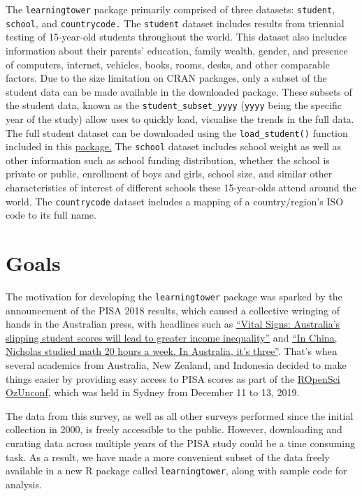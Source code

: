 \documentclass[
  11pt,
  a4paper,
]{article}
\begin{document}
The \texttt{learningtower} package primarily comprised of three
datasets: \texttt{student}, \texttt{school}, and \texttt{countrycode.}
The \texttt{student} dataset includes results from triennial testing of
15-year-old students throughout the world. This dataset also includes
information about their parents' education, family wealth, gender, and
presence of computers, internet, vehicles, books, rooms, desks, and
other comparable factors. Due to the size limitation on CRAN packages,
only a subset of the student data can be made available in the
downloaded package. These subsets of the student data, known as the
\texttt{student\_subset\_yyyy} (\texttt{yyyy} being the specific year of
the study) allow uses to quickly load, visualise the trends in the full
data. The full student dataset can be downloaded using the
\texttt{load\_student()} function included in this
\href{https://kevinwang09.github.io/learningtower/}{package.} The
\texttt{school} dataset includes school weight as well as other
information such as school funding distribution, whether the school is
private or public, enrollment of boys and girls, school size, and
similar other characteristics of interest of different schools these
15-year-olds attend around the world. The \texttt{countrycode} dataset
includes a mapping of a country/region's ISO code to its full name.

\section{Goals}\label{goals}

The motivation for developing the \texttt{learningtower} package was
sparked by the announcement of the PISA 2018 results, which caused a
collective wringing of hands in the Australian press, with headlines
such as
\href{https://theconversation.com/vital-signs-australias-slipping-student-scores-will-lead-to-greater-income-inequality-128301}{``Vital
Signs: Australia's slipping student scores will lead to greater income
inequality''} and
\href{https://www.smh.com.au/education/in-china-nicholas-studied-maths-20-hours-a-week-in-australia-it-s-three-20191203-p53ggv.html}{``In
China, Nicholas studied math 20 hours a week. In Australia, it's
three''}. That's when several academics from Australia, New Zealand, and
Indonesia decided to make things easier by providing easy access to PISA
scores as part of the \href{https://ozunconf19.ropensci.org/}{ROpenSci
OzUnconf}, which was held in Sydney from December 11 to 13, 2019.

The data from this survey, as well as all other surveys performed since
the initial collection in 2000, is freely accessible to the public.
However, downloading and curating data across multiple years of the PISA
study could be a time consuming task. As a result, we have made a more
convenient subset of the data freely available in a new R package called
\texttt{learningtower}, along with sample code for analysis.
\end{document}
